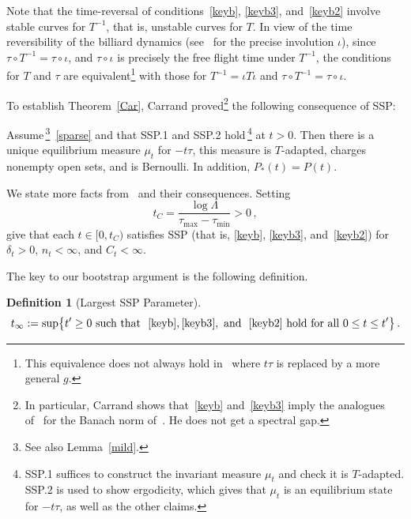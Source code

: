 \documentclass[10pt]{amsart}
\theoremstyle{definition}\newtheorem{defi}[theo]{Definition}\newtheorem{rema}[theo]{Remark}\newtheorem{exam}[theo]{Example}\newtheorem{exem}[theo]{Example}\newtheorem{nota}[theo]{Notation}
\begin{document}
Note that the time-reversal of conditions~\eqref{keyb}, \eqref{keyb3}, and~\eqref{keyb2} involve stable curves for $T^{-1}$, that is, unstable curves for $T$. In view of the time reversibility of the billiard dynamics (see~\cite[\S~2.14]{CM} for the precise involution $\iota$), since $\tau \circ T^{-1}=\tau\circ \iota$, and $\tau \circ \iota$ is precisely the free flight time under $T^{-1}$, the conditions for $T$ and $\tau$ are equivalent\footnote{This equivalence does not always hold in~\cite{Ca} where $t\tau$ is replaced by a more general $g$.} with those for $T^{-1}=\iota T\iota$ and $\tau \circ T^{-1}=\tau\circ \iota$.


To establish Theorem~\ref{Car}, Carrand proved\footnote{In particular, Carrand shows that~\eqref{keyb} and~\eqref{keyb3} imply the analogues~\cite[Propositions~3.7 and 3.10]{Ca} of~\cite[Propositions~3.14 and 3.15]{BD2} for the Banach norm of~\cite{BD1}. He does not get a spectral gap.} the following consequence of SSP:

\begin{prop}[{\cite[Theorem~1.2]{Ca}}]\label{Car3}
Assume\,\footnote{See also Lemma~\ref{mild}.}~\eqref{sparse} and that
SSP.1 and SSP.2 hold\,\footnote{SSP.1 suffices to construct the invariant measure $\mu_t$ and check it is $T$-adapted. SSP.2 is used to show ergodicity, which gives that $\mu_t$ is an equilibrium state for $-t\tau$, as well as the other claims.} at $t>0$. Then there is a unique equilibrium measure $\mu_t$ for $-t\tau$, this measure is $T$-adapted, charges nonempty open sets, and is Bernoulli. In addition, $P_*(t)=P(t)$.
\end{prop}


We state more facts from~\cite{Ca} and their consequences. Setting
\begin{equation}\label{deftC}
t_C=\frac {\log \Lambda}{\tau_{\max} -\tau_{\min}} >0\,,
\end{equation}
\cite[Lemmas~3.3 and~3.4 and Corollary~3.6]{Ca} give that each $t\in [0,t_C)$ satisfies SSP (that is, \eqref{keyb}, \eqref{keyb3}, and~\eqref{keyb2}) for $\delta_t>0$, $n_t<\infty$, and $C_t<\infty$.


The key to our bootstrap argument is the following definition.

\begin{defi}[Largest SSP Parameter]
\begin{equation}\label{bart}
t_\infty:=\sup\bigl \{ t'\ge 0 \text{ such that }~\eqref{keyb}, \eqref{keyb3}, \text{ and }~\eqref{keyb2} \text{ hold for all } 0\le t\le t'\bigr \} \,.
\end{equation}
\end{defi}
\end{document}
